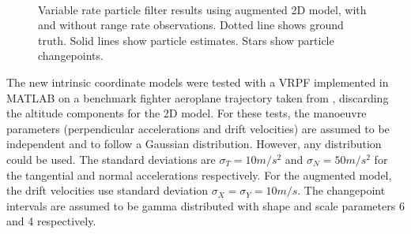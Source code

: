 \documentclass[conference]{IEEEtran}
\begin{document}
\begin{figure}[!t]
\centering
{}
\\
\caption{Variable rate particle filter results using augmented 2D model, with and without range rate observations. Dotted line shows ground truth. Solid lines show particle estimates. Stars show particle changepoints.}
\label{fig:2D_Model2}
\end{figure}
%
The new intrinsic coordinate models were tested with a VRPF implemented in MATLAB on a benchmark fighter aeroplane trajectory taken from \cite{Blair1998}, discarding the altitude components for the 2D model. For these tests, the manoeuvre parameters (perpendicular accelerations and drift velocities) are assumed to be independent and to follow a Gaussian distribution. However, any distribution could be used. The standard deviations are $\sigma_T = 10 m/s^2$ and $\sigma_N = 50 m/s^2$ for the tangential and normal accelerations respectively. For the augmented model, the drift velocities use standard deviation $\sigma_X = \sigma_Y = 10 m/s$. The changepoint intervals are assumed to be gamma distributed with shape and scale parameters 6 and 4 respectively.
\end{document}
